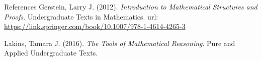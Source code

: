 \documentclass [aspectratio=169]{beamer}
\begin{document}
\begin{frame}{References}
Gerstein, Larry J. (2012). \textit{Introduction to Mathematical Structures and Proofs}. Undergraduate Texts in Mathematics. url: \href{https://link.springer.com/book/10.1007/978-1-4614-4265-3}{https://link.springer.com/book/10.1007/978-1-4614-4265-3}


\vspace{1em}

Lakins, Tamara J. (2016). \textit{The Tools of Mathematical Reasoning}. Pure and Applied Undergraduate Texts. 


\end{frame}
\end{document}
